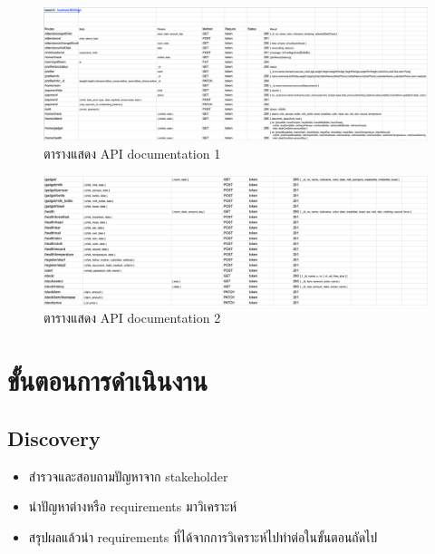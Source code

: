 \begin{landscape}
  \begin{figure}
    \begin{center}
      \includegraphics[width=\linewidth]{images/ApiDocOne.png}
    \end{center}
    \caption{ตารางแสดง API documentation 1}
    \label{fig:ApiDocs1}
  \end{figure}

  \begin{figure}
    \begin{center}
      \includegraphics[width=\linewidth]{images/ApiDocTwo.png}
    \end{center}
    \caption{ตารางแสดง API documentation 2}
    \label{fig:ApiDocs2}
  \end{figure}
\end{landscape}

\section{ขั้นตอนการดำเนินงาน}
\subsection{Discovery}
\begin{itemize}
  \item สำรวจและสอบถามปัญหาจาก stakeholder
  \item นำปัญหาต่างหรือ requirements มาวิเคราะห์
  \item สรุปผลแล้วนำ requirements ที่ได้จากการวิเคราะห์ไปทำต่อในขั้นตอนถัดไป
\end{itemize}

